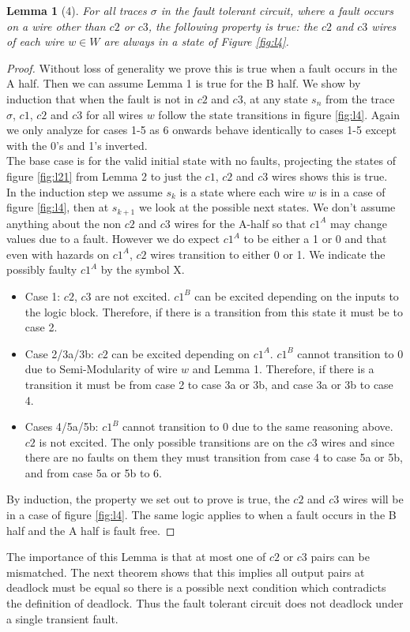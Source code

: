\documentclass[12pt]{report}
\newtheorem*{lemma}{Lemma}
\begin{document}
\begin{lemma}[4]
For all traces $\sigma$ in the fault tolerant circuit, where a fault occurs on a wire other than $c2$ or $c3$, the following property is true: the $c2$ and $c3$ wires of each wire $w\in W$ are always in a state of Figure \ref{fig:l4}.
\end{lemma}
\begin{proof}
Without loss of generality we prove this is true when a fault occurs in the A half.  Then we can assume Lemma 1 is true for the B half.  We show by induction that when the fault is not in $c2$ and $c3$, at any state $s_n$ from the trace $\sigma$, $c1$, $c2$ and $c3$ for all wires $w$ follow the state transitions in figure \ref{fig:l4}.  Again we only analyze for cases 1-5 as 6 onwards behave identically to cases 1-5 except with the 0's and 1's inverted.\\

The base case is for the valid initial state with no faults, projecting the states of figure \ref{fig:l21} from Lemma 2 to just the $c1$, $c2$ and $c3$ wires shows this is true. \\

In the induction step we assume $s_k$ is a state where each wire $w$ is in a case of figure \ref{fig:l4}, then at $s_{k+1}$ we look at the possible next states.  We don't assume anything about the non $c2$ and $c3$ wires for the A-half so that $c1^A$ may change values due to a fault.  However we do expect $c1^A$ to be either a 1 or 0 and that even with hazards on $c1^A$, $c2$ wires transition to either 0 or 1.  We indicate the possibly faulty $c1^A$ by the symbol X.
\begin{itemize}
	\item
Case 1:  $c2$, $c3$ are not excited.  $c1^B$ can be excited depending on the inputs to the logic block.  Therefore, if there is a transition from this state it must be to case 2.
\item
Case 2/3a/3b:  $c2$ can be excited depending on $c1^A$.  $c1^B$ cannot transition to 0 due to Semi-Modularity of wire $w$ and Lemma 1.  Therefore, if there is a transition it must be from case 2 to case 3a or 3b, and case 3a or 3b to case 4.
\item
Cases 4/5a/5b:  $c1^B$ cannot transition to 0 due to the same reasoning above.  $c2$ is not excited. The only possible transitions are on the $c3$ wires and since there are no faults on them they must transition from case 4 to case 5a or 5b, and from case 5a or 5b to 6.
\end{itemize}
By induction, the property we set out to prove is true, the $c2$ and $c3$ wires will be in a case of figure \ref{fig:l4}. 
The same logic applies to when a fault occurs in the B half and the A half is fault free.  
\end{proof}
The importance of this Lemma is that at most one of $c2$ or $c3$ pairs can be mismatched.  The next theorem shows that this implies all output pairs at deadlock must be equal so there is a possible next condition which contradicts the definition of deadlock.  Thus the fault tolerant circuit does not deadlock under a single transient fault.
\end{document}
